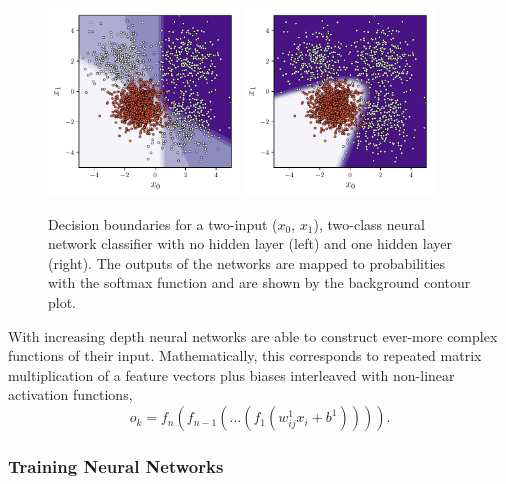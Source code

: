 \begin{figure}[h!]
    \begin{center}
        \includegraphics[width=0.45\textwidth]{figures/machine_learning/decision_bound_tanh_depth_1.pdf}
        \includegraphics[width=0.45\textwidth]{figures/machine_learning/decision_bound_tanh_depth_2.pdf}
    \end{center}
    \caption{Decision boundaries for a two-input ($x_{0}$, $x_{1}$), two-class neural network classifier with no hidden layer (left) and one hidden layer (right). The outputs of the networks are mapped to probabilities with the softmax function and are shown by the background contour plot. }
        \label{fig:machine_learning:mlp_example}
\end{figure}
With increasing depth neural networks are able to construct ever-more complex functions of their input. 
Mathematically, this corresponds to repeated matrix multiplication of a feature vectors plus biases interleaved with non-linear activation functions,
\begin{equation}
    o_{k} = f_{n}(f_{n-1}(\dots{}(f_{1}(w^{1}_{ij}x_{i} + b^{1})))).
\end{equation}



\subsubsection{Training Neural Networks}


